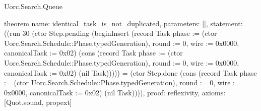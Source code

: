 \begin{lexlean}{Uorc.Search.Queue}
\begin{semanticmodule}
theorem{
  name: identical_task_is_not_duplicated,
  parameters: [],
  statement: ((run 30 (ctor Step.pending (beginInsert (record Task {phase := (ctor Uorc.Search.Schedule::Phase.typedGeneration), round := 0, wire := 0x0000, canonicalTask := 0x02}) (cons (record Task {phase := (ctor Uorc.Search.Schedule::Phase.typedGeneration), round := 0, wire := 0x0000, canonicalTask := 0x02}) (nil Task))))) = (ctor Step.done (cons (record Task {phase := (ctor Uorc.Search.Schedule::Phase.typedGeneration), round := 0, wire := 0x0000, canonicalTask := 0x02}) (nil Task)))),
  proof: reflexivity{},
  axioms: [Quot.sound, propext]
}
\end{semanticmodule}
\end{lexlean}
